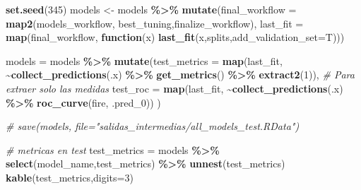 \documentclass[12pt,a4paper,]{book}
\newenvironment{Shaded}{\begin{snugshade}}{\end{snugshade}}
\newcommand{\AttributeTok}[1]{\textcolor[rgb]{0.13,0.29,0.53}{#1}}
\newcommand{\CommentTok}[1]{\textcolor[rgb]{0.56,0.35,0.01}{\textit{#1}}}
\newcommand{\ControlFlowTok}[1]{\textcolor[rgb]{0.13,0.29,0.53}{\textbf{#1}}}
\newcommand{\DecValTok}[1]{\textcolor[rgb]{0.00,0.00,0.81}{#1}}
\newcommand{\FunctionTok}[1]{\textcolor[rgb]{0.13,0.29,0.53}{\textbf{#1}}}
\newcommand{\NormalTok}[1]{#1}
\newcommand{\OtherTok}[1]{\textcolor[rgb]{0.56,0.35,0.01}{#1}}
\newcommand{\SpecialCharTok}[1]{\textcolor[rgb]{0.81,0.36,0.00}{\textbf{#1}}}
\numberwithin{dummy}{section}
\theoremstyle{ocrenumbox}
\theoremstyle{blacknumex}
\theoremstyle{blacknumbox}
\theoremstyle{ocrenum}
\theoremstyle{ocrenum}
\begin{document}
\begin{Shaded}
\begin{Highlighting}[]
\FunctionTok{set.seed}\NormalTok{(}\DecValTok{345}\NormalTok{)}
\NormalTok{models }\OtherTok{\textless{}{-}}\NormalTok{ models }\SpecialCharTok{\%\textgreater{}\%} 
  \FunctionTok{mutate}\NormalTok{(}\AttributeTok{final\_workflow =} \FunctionTok{map2}\NormalTok{(models\_workflow, best\_tuning,finalize\_workflow),}
         \AttributeTok{last\_fit =} \FunctionTok{map}\NormalTok{(final\_workflow, }\ControlFlowTok{function}\NormalTok{(x) }\FunctionTok{last\_fit}\NormalTok{(x,splits,}\AttributeTok{add\_validation\_set=}\NormalTok{T)))}

\NormalTok{models }\OtherTok{=}\NormalTok{ models }\SpecialCharTok{\%\textgreater{}\%} 
  \FunctionTok{mutate}\NormalTok{(}\AttributeTok{test\_metrics =} \FunctionTok{map}\NormalTok{(last\_fit,      }
                            \SpecialCharTok{\textasciitilde{}}\FunctionTok{collect\_predictions}\NormalTok{(.x) }\SpecialCharTok{\%\textgreater{}\%}                                                  \FunctionTok{get\_metrics}\NormalTok{() }\SpecialCharTok{\%\textgreater{}\%}  
                              \FunctionTok{extract2}\NormalTok{(}\DecValTok{1}\NormalTok{)), }\CommentTok{\# Para extraer solo las medidas}
         \AttributeTok{test\_roc =} \FunctionTok{map}\NormalTok{(last\_fit,}
                        \SpecialCharTok{\textasciitilde{}}\FunctionTok{collect\_predictions}\NormalTok{(.x) }\SpecialCharTok{\%\textgreater{}\%}                                              \FunctionTok{roc\_curve}\NormalTok{(fire, .pred\_0))                           ) }

\CommentTok{\# save(models, file="salidas\_intermedias/all\_models\_test.RData")}

\CommentTok{\# metricas en test}
\NormalTok{test\_metrics }\OtherTok{=}\NormalTok{ models }\SpecialCharTok{\%\textgreater{}\%} \FunctionTok{select}\NormalTok{(model\_name,test\_metrics) }\SpecialCharTok{\%\textgreater{}\%} \FunctionTok{unnest}\NormalTok{(test\_metrics)}
\FunctionTok{kable}\NormalTok{(test\_metrics,}\AttributeTok{digits=}\DecValTok{3}\NormalTok{)}


\end{Highlighting}
\end{Shaded}
\end{document}
